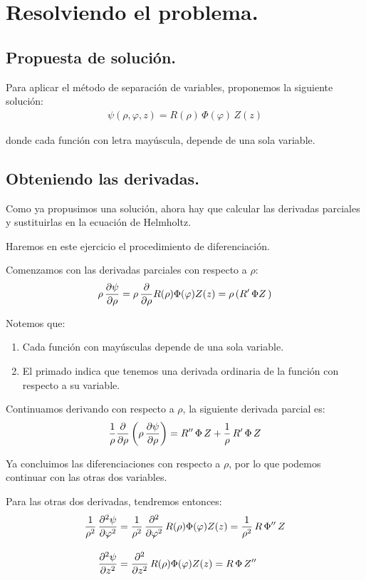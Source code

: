 \section{Resolviendo el problema.}

\subsection{Propuesta de solución.}

Para aplicar el método de separación de variables, proponemos la siguiente solución:
\begin{align*}
\psi (\rho, \varphi, z) = R(\rho) \, \Phi (\varphi) \, Z(z)
\end{align*}

donde cada función con letra mayúscula, depende de una sola variable.


\subsection{Obteniendo las derivadas.}

Como ya propusimos una solución, ahora hay que calcular las derivadas parciales y sustituirlas en la ecuación de Helmholtz.
\par
Haremos en este ejercicio el procedimiento de diferenciación.
\par
Comenzamos con las derivadas parciales con respecto a $\rho$:
\begin{align*}
\rho \, \pdv{\psi}{\rho} =  \rho \, \pdv{\rho} R(\rho) \Phi (\varphi) Z(z) =  \rho \left( {R}^{\prime} \, \Phi Z \, \right)
\end{align*}

Notemos que:
\begin{enumerate}
\item Cada función con mayúsculas depende de una sola variable.
\item El primado indica que tenemos una derivada ordinaria de la función con respecto a su variable.
\end{enumerate}

Continuamos derivando con respecto a $\rho$, la siguiente derivada parcial es:
\begin{align*}
\dfrac{1}{\rho} \pdv{\rho} \left( \rho \, \pdv{\psi}{\rho}  \right) =  {R}^{\prime \prime} \, \Phi \, Z + \dfrac{1}{\rho} \, {R}^{\prime} \, \Phi \, Z
\end{align*}

Ya concluimos las diferenciaciones con respecto a $\rho$, por lo que podemos continuar con las otras dos variables.
\par
Para las otras dos derivadas, tendremos entonces:
\begin{align*}
\dfrac{1}{\rho^{2}} \, \pdv[2]{\psi}{\varphi} &=  \dfrac{1}{\rho^{2}} \, \pdv[2]{\varphi} \, R(\rho) \Phi (\varphi) Z(z) =  \dfrac{1}{\rho^{2}} \, R \, {\Phi}^{\prime \prime} \, Z \\[1em] 
\pdv[2]{\psi}{z} &=  \pdv[2]{z} \, R(\rho) \Phi (\varphi) Z(z) =  R \, \Phi \, {Z}^{\prime \prime}
\end{align*}

